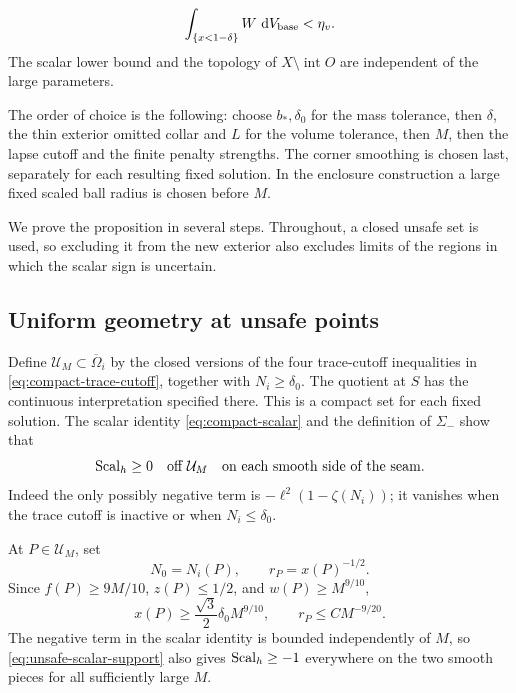 \begin{proposition}
\begin{enumerate}[label=\textup{(\roman*)}]
\begin{equation}
 \int_{\{x<1-\delta\}}W\,\mathop{}\!\mathrm d V_{\rm base}<\eta_v.
 \label{eq:unsafe-bad-volume-output}
\end{equation}
The scalar lower bound and the topology of \(X\setminus
\operatorname{int}O\) are independent of the large parameters.
\end{enumerate}
The order of choice is the following: choose \(b_*,\delta_0\) for the
mass tolerance, then \(\delta\), the thin exterior omitted collar and
\(L\) for the volume tolerance, then \(M\), then the lapse cutoff and
the finite penalty strengths.  The corner smoothing is chosen last,
separately for each resulting fixed solution.  In the enclosure
construction a large fixed scaled ball radius is chosen before \(M\).
\end{proposition}

We prove the proposition in several steps.  Throughout, a closed unsafe
set is used, so excluding it from the new exterior also excludes limits
of the regions in which the scalar sign is uncertain.

\subsection{Uniform geometry at unsafe points}

Define \(\mathcal U_M\subset\overline\Omega_i\) by the closed
versions of the four trace-cutoff inequalities in
\eqref{eq:compact-trace-cutoff}, together with \(N_i\ge\delta_0\).
The quotient at \(S\) has the continuous interpretation specified
there.  This is a compact set for each fixed solution.  The scalar
identity \eqref{eq:compact-scalar} and the definition of \(\Sigma_-\)
show that
\begin{equation}
 \operatorname{Scal}_h\ge0\quad\hbox{off }\mathcal U_M
 \quad\hbox{on each smooth side of the seam}.
 \label{eq:unsafe-scalar-support}
\end{equation}
Indeed the only possibly negative term is
\(-\ell^2(1-\zeta(N_i))\); it vanishes when the trace cutoff is
inactive or when \(N_i\le\delta_0\).

At \(P\in\mathcal U_M\), set
\begin{equation}
 N_0=N_i(P),\qquad r_P=x(P)^{-1/2}.
 \label{eq:unsafe-scale}
\end{equation}
Since \(f(P)\ge9M/10\), \(z(P)\le1/2\), and
\(w(P)\ge M^{9/10}\),
\begin{equation}
 x(P)\ge\frac{\sqrt3}{2}\delta_0 M^{9/10},\qquad
 r_P\le C M^{-9/20}.
 \label{eq:unsafe-radius-bound}
\end{equation}
The negative term in the scalar identity is bounded independently of
\(M\), so \eqref{eq:unsafe-scalar-support} also gives
\(\operatorname{Scal}_h\ge-1\) everywhere on the two smooth pieces for all
sufficiently large \(M\).

